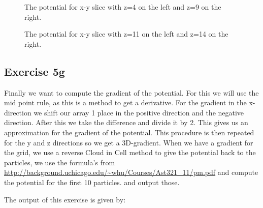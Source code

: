  \begin{figure}
    \centering
    \qquad
    \caption{The potential for x-y slice with z=4 on the left and z=9 on the right.}
  \end{figure}

 \begin{figure}
    \centering
    \qquad
    \caption{The potential for x-y slice with z=11 on the left and z=14 on the right.}
  \end{figure}
  
  \subsection{Exercise 5g}
  Finally we want to compute the gradient of the potential. For this we will use the mid point rule, as this is a method to get a derivative. For the gradient in the x-direction we shift our array 1 place in the positive direction and the negative direction. After this we take the difference and divide it by 2. This gives us an approximation for the gradient of the potential. This procedure is then repeated for the y and z directions so we get a 3D-gradient. 
  When we have a gradient for the grid, we use a reverse Cloud in Cell method to give the potential back to the particles, we use the formula's from \url{http://background.uchicago.edu/~whu/Courses/Ast321_11/pm.pdf} and compute the potential for the first 10 particles. and output those.
  
  The output of this exercise is given by:


  
